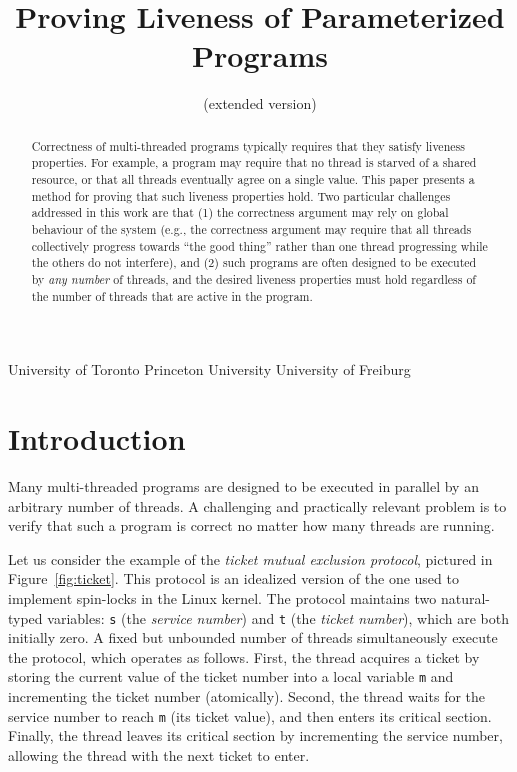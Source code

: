 \documentclass[9pt,nocopyrightspace]{sigplanconf}
\theoremstyle{definition}
\begin{document}
\title{Proving Liveness of Parameterized Programs}
\subtitle{(extended version)}
           {University of Toronto}{}
           {}
           {Princeton University}{}
           {}
           {University of Freiburg}{}
           {}


\maketitle

\begin{abstract}
  Correctness of multi-threaded programs typically requires that they satisfy
  liveness properties.  For example, a program may require that no
  thread is starved of a shared resource, or that all threads eventually agree
  on a single value.  This paper presents a method for proving that such
  liveness properties hold.  Two particular challenges addressed in
  this work are that (1) the correctness argument may rely on global behaviour
  of the system (e.g., the correctness argument may require that all threads
  collectively progress towards ``the good thing'' rather than one thread
  progressing while the others do not interfere), and (2) such programs are
  often designed to be executed by \emph{any number} of threads, and the
  desired liveness properties must hold regardless of the number of threads that are active
  in the program.
\end{abstract}

\section{Introduction} \label{sec:intro}

Many multi-threaded programs are designed to be executed in parallel by an arbitrary
number of threads.  A challenging and practically relevant problem is to
verify that such a program is correct no matter how many threads are running.

Let us consider the example of the \emph{ticket mutual exclusion protocol}, pictured
in Figure~\ref{fig:ticket}.  This protocol is an idealized version of the one
used to implement spin-locks in the Linux kernel. The protocol maintains two
natural-typed variables: \texttt{s} (the \emph{service number}) and
\texttt{t} (the \emph{ticket number}), which are both initially zero.  A
fixed but unbounded number of threads simultaneously execute the protocol, which operates as follows.  First, the thread acquires a ticket by
storing the current value of the ticket number into a local variable
\texttt{m} and incrementing the ticket number (atomically).  Second, the thread waits for
the service number to reach \texttt{m} (its ticket value), and then enters
its critical section.  Finally, the thread leaves its critical section by
incrementing the service number, allowing the thread with the next ticket to
enter.
\end{document}
